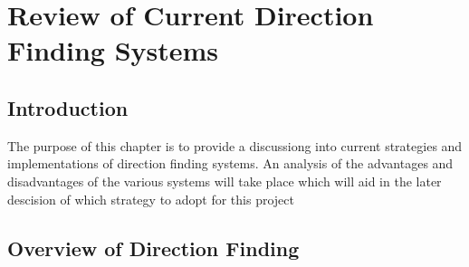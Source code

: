 \chapter{Review of Current Direction Finding Systems}

\section{Introduction}
The purpose of this chapter is to provide a discussiong into current strategies and implementations of direction finding systems. An analysis of the advantages and disadvantages of the various systems will take place which will aid in the later descision of which strategy to adopt for this project

\section{Overview of Direction Finding}

